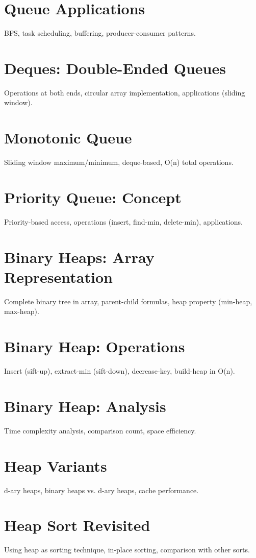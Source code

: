 \chapter{Queue Applications}
BFS, task scheduling, buffering, producer-consumer patterns.

\chapter{Deques: Double-Ended Queues}
Operations at both ends, circular array implementation, applications (sliding window).

\chapter{Monotonic Queue}
Sliding window maximum/minimum, deque-based, O(n) total operations.

\chapter{Priority Queue: Concept}
Priority-based access, operations (insert, find-min, delete-min), applications.

\chapter{Binary Heaps: Array Representation}
Complete binary tree in array, parent-child formulas, heap property (min-heap, max-heap).

\chapter{Binary Heap: Operations}
Insert (sift-up), extract-min (sift-down), decrease-key, build-heap in O(n).

\chapter{Binary Heap: Analysis}
Time complexity analysis, comparison count, space efficiency.

\chapter{Heap Variants}
d-ary heaps, binary heaps vs. d-ary heaps, cache performance.

\chapter{Heap Sort Revisited}
Using heap as sorting technique, in-place sorting, comparison with other sorts.

